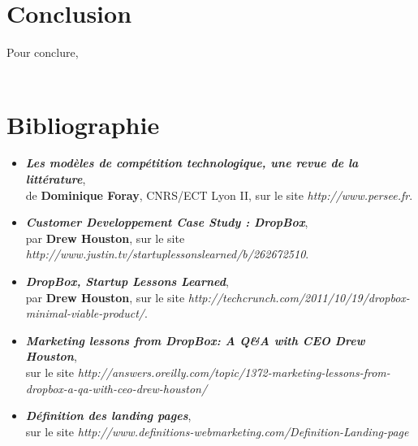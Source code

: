 \documentclass[a4paper, 10pt]{article}
\begin{document}
\section*{Conclusion}
\indent

Pour conclure,\\ \\

\newpage
\section*{Bibliographie}
\begin{itemize}
 \item \textit{\textbf{Les modèles de compétition technologique, une revue de la littérature}},\\
de \textbf{Dominique Foray}, CNRS/ECT Lyon II, sur le site \textit{http://www.persee.fr}.
 \item \textit{\textbf{Customer Developpement Case Study : DropBox}},\\
par \textbf{Drew Houston}, sur le site \textit{http://www.justin.tv/startuplessonslearned/b/262672510}.
 \item \textit{\textbf{DropBox, Startup Lessons Learned}},\\
par \textbf{Drew Houston}, sur le site \textit{http://techcrunch.com/2011/10/19/dropbox-minimal-viable-product/}.
 \item \textit{\textbf{Marketing lessons from DropBox: A Q\&A with CEO Drew Houston}},\\
sur le site \textit{http://answers.oreilly.com/topic/1372-marketing-lessons-from-dropbox-a-qa-with-ceo-drew-houston/}
 \item \textit{\textbf{Définition des landing pages}},\\
sur le site \textit{http://www.definitions-webmarketing.com/Definition-Landing-page}
\end{itemize}
\end{document}
